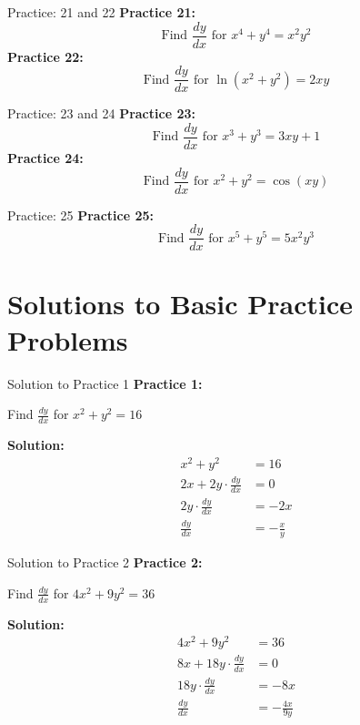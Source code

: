 \documentclass[aspectratio=169]{beamer}
\begin{document}
\begin{frame}{Practice: 21 and 22}
\textbf{Practice 21:}
\[
\text{Find } \frac{dy}{dx} \text{ for } x^4 + y^4 = x^2y^2
\]
\vspace{1em}
\textbf{Practice 22:}
\[
\text{Find } \frac{dy}{dx} \text{ for } \ln(x^2 + y^2) = 2xy
\]
\end{frame}

\begin{frame}{Practice: 23 and 24}
\textbf{Practice 23:}
\[
\text{Find } \frac{dy}{dx} \text{ for } x^3 + y^3 = 3xy + 1
\]
\vspace{1em}
\textbf{Practice 24:}
\[
\text{Find } \frac{dy}{dx} \text{ for } x^2 + y^2 = \cos(xy)
\]
\end{frame}

\begin{frame}{Practice: 25}
\textbf{Practice 25:}
\[
\text{Find } \frac{dy}{dx} \text{ for } x^5 + y^5 = 5x^2y^3
\]
\end{frame}

\section{Solutions to Basic Practice Problems}

\begin{frame}{Solution to Practice 1}
\textbf{Practice 1:}

Find $\frac{dy}{dx}$ for $x^2 + y^2 = 16$

\textbf{Solution:}
\[
\begin{aligned}
  x^2 + y^2 &= 16 \\
  2x + 2y \cdot \frac{dy}{dx} &= 0 \\
  2y \cdot \frac{dy}{dx} &= -2x \\
  \frac{dy}{dx} &= -\frac{x}{y}
\end{aligned}
\]
\end{frame}

\begin{frame}{Solution to Practice 2}
\textbf{Practice 2:}

Find $\frac{dy}{dx}$ for $4x^2 + 9y^2 = 36$

\textbf{Solution:}
\[
\begin{aligned}
  4x^2 + 9y^2 &= 36 \\
  8x + 18y \cdot \frac{dy}{dx} &= 0 \\
  18y \cdot \frac{dy}{dx} &= -8x \\
  \frac{dy}{dx} &= -\frac{4x}{9y}
\end{aligned}
\]
\end{frame}
\end{document}
